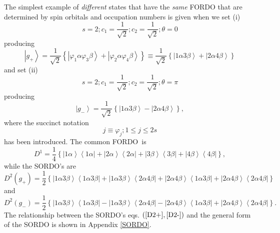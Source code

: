 \documentclass[aps,preprint]{revtex4}%
\begin{document}
The simplest example of \emph{different} states that have the \emph{same}
FORDO that are determined by spin orbitals and occupation numbers is given
when we set (i)
\begin{equation}
s=2;c_{1}=\frac{1}{\sqrt{2}};c_{2}=\frac{1}{\sqrt{2}};\theta=0
\end{equation}
producing%
\begin{equation}
\left\vert g_{+}\right\rangle =\frac{1}{\sqrt{2}}\left\{  \left\vert
\varphi_{1}\alpha\varphi_{3}\beta\right\rangle +\left\vert \varphi_{2}%
\alpha\varphi_{4}\beta\right\rangle \right\}  \equiv\frac{1}{\sqrt{2}}\left\{
\left\vert 1\alpha3\beta\right\rangle +\left\vert 2\alpha4\beta\right\rangle
\right\}  \label{ex1}%
\end{equation}
and set (ii)
\begin{equation}
s=2;c_{1}=\frac{1}{\sqrt{2}};c_{2}=\frac{1}{\sqrt{2}};\theta=\pi
\end{equation}
producing
\begin{equation}
\left\vert g_{-}\right\rangle =\frac{1}{\sqrt{2}}\left\{  \left\vert
1\alpha3\beta\right\rangle -\left\vert 2\alpha4\beta\right\rangle \right\}
,\label{ex2}%
\end{equation}
where the succinct notation
\begin{equation}
j\equiv\varphi_{j};1\leq j\leq2s
\end{equation}
has been introduced. The common FORDO\ is
\begin{equation}
D^{1}=\frac{1}{4}\left\{  \left\vert 1\alpha\right\rangle \left\langle
1\alpha\right\vert +\left\vert 2\alpha\right\rangle \left\langle
2\alpha\right\vert +\left\vert 3\beta\right\rangle \left\langle 3\beta
\right\vert +\left\vert 4\beta\right\rangle \left\langle 4\beta\right\vert
\right\}  ,\label{D1+-}%
\end{equation}
while the SORDO's are
\begin{equation}
D^{2}\left(  g_{+}\right)  =\frac{1}{2}\left\{  \left\vert 1\alpha
3\beta\right\rangle \left\langle 1\alpha3\beta\right\vert +\left\vert
1\alpha3\beta\right\rangle \left\langle 2\alpha4\beta\right\vert +\left\vert
2\alpha4\beta\right\rangle \left\langle 1\alpha3\beta\right\vert +\left\vert
2\alpha4\beta\right\rangle \left\langle 2\alpha4\beta\right\vert \right\}
\label{D2+}%
\end{equation}
and
\begin{equation}
D^{2}\left(  g_{-}\right)  =\frac{1}{2}\left\{  \left\vert 1\alpha
3\beta\right\rangle \left\langle 1\alpha3\beta\right\vert -\left\vert
1\alpha3\beta\right\rangle \left\langle 2\alpha4\beta\right\vert -\left\vert
2\alpha4\beta\right\rangle \left\langle 1\alpha3\beta\right\vert +\left\vert
2\alpha4\beta\right\rangle \left\langle 2\alpha4\beta\right\vert \right\}
.\label{D2-}%
\end{equation}
The relationship between the SORDO's eqs. $\left(  \ref{D2+},\ref{D2-}\right)
$ and the general form of the SORDO is shown in Appendix \ref{SORDO}.
\end{document}
